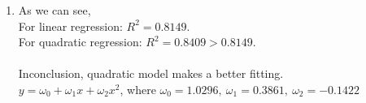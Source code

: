 \documentclass[11pt,letter,notitlepage]{article}
\begin{document}
\begin{solution}
\begin{enumerate}
\begin{enumerate}
			\item
			As we can see,\\
			For linear regression: $R^2=0.8149$.\\
			For quadratic regression: $R^2=0.8409>0.8149$.\\\\
			Inconclusion, quadratic model makes a better fitting.\\
			$y=\omega_0+\omega_1x+\omega_2x^2$, where $\omega_0=1.0296,~\omega_1=0.3861,~\omega_2=-0.1422$
			
		\end{enumerate}
		
	\end{enumerate}
\end{solution}
\newpage
\end{document}
